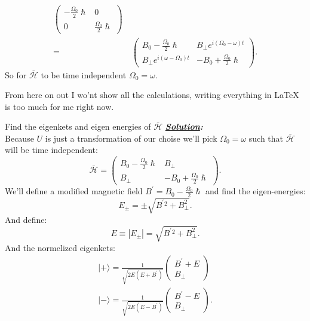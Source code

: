 \documentclass[notitlepage]{report}
\begin{document}
\begin{question}[title = Question 6]{}{}
\begin{question}[title = Part 4]{}{}
\begin{align*}
	\begin{pmatrix}
		-\frac{\Omega_0}{2}\hslash & 0\\
		0 & \frac{\Omega_0}{2}\hslash
	\end{pmatrix}\\
	 =&\ \begin{pmatrix}
		B_0-\frac{\Omega_0}{2}\hslash & B_{\perp}e^{i\left(\Omega_0-\omega\right) t}\\
		B_{\perp}e^{i\left(\omega-\Omega_0\right) t} & -B_0+\frac{\Omega_0}{2}\hslash
	\end{pmatrix}
.\end{align*}
So for $\bar{\mathcal{H}}$ to be time independent $\Omega_0=\omega$.
\end{question}
From here on out I wo'nt show all the calculations, writing everything in \LaTeX\xspace is too much for me right now.
\begin{question}[title = Part 5]{}{}
	Find the eigenkets and eigen energies of $\bar{\mathcal{H}}$
\tcblower
\textbf{\emph{\underline{Solution}:}}\\
Because $U$ is just a transformation of our choise we'll pick $\Omega_0=\omega$ such that $\bar{\mathcal{H}}$ will be time independent:\\
\[
	\bar{\mathcal{H}}=
	\begin{pmatrix}
		B_0-\frac{\Omega_0}{2}\hslash & B_{\perp}\\
		B_{\perp} & -B_0+\frac{\Omega_0}{2}\hslash
	\end{pmatrix}
.\] 
We'll define a modified magnetic field $B^\prime=B_0-\frac{\Omega_0}{2}\hslash$ and find the eigen-energies:\\
 \[
	 E_{\pm}=\pm\sqrt{B^{\prime}{}^2+B_\perp^2} 	
.\] 
And define:\\
\[
	E\equiv|E_\pm|=\sqrt{B^{\prime}{}^2+B_\perp^2}
.\] 
And the normelized eigenkets:\\
\begin{align*}
	|+\rangle=\frac{1}{\sqrt{2E\left(E+B^\prime\right) }}
	\begin{pmatrix}
		B^\prime+E\\
		B_{\perp}
	\end{pmatrix}\\
	|-\rangle=\frac{1}{\sqrt{2E\left(E-B^\prime\right)}}
	\begin{pmatrix}
		B^\prime-E\\
		B_{\perp}
	\end{pmatrix}
.\end{align*}
\end{question}

\end{question}
\end{document}
